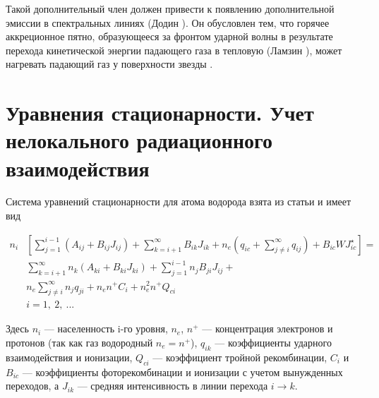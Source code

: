 \documentclass[12pt]{article}
\begin{document}
Такой дополнительный член должен привести к появлению дополнительной эмиссии в спектральных линиях (Додин \cite{dodin18}). Он обусловлен тем, что горячее аккреционное пятно, образующееся за фронтом ударной волны в результате перехода кинетической энергии падающего газа в тепловую (Ламзин \cite{lamzin98}),
 может нагревать падающий газ у поверхности звезды \cite{dodin18}.


\section{Уравнения стационарности. Учет нелокального радиационного взаимодействия}

Система уравнений стационарности для атома водорода взята из статьи \cite{katysheva80} и имеет вид

 
\begin{align} \label{eq:stat}
n_i & \left[ \sum\limits_{j=1}^{i-1} (A_{ij} + B_{ij}J_{ij}) + \sum\limits_{k=i+1}^\infty B_{ik}J_{ik} + n_e ( q_{ic} + \sum\limits_{j \neq i}^\infty q_{ij} ) + B_{ic}WJ_{ic}^\star \right] = \nonumber \\
 & \sum\limits_{k=i+1}^\infty n_k (A_{ki} + B_{ki}J_{ki}) + \sum\limits_{j=1}^{i-1} n_jB_{ji}J_{ij} + \nonumber \\
 & n_e \sum\limits_{j\neq i}^\infty n_jq_{ji} + n_en^+C_i + n_e^2n^+Q_{ci} \\
 & i=1,\ 2,\ ... \nonumber
\end{align}

Здесь $n_i$ --- населенность i-го уровня, $n_e$, $n^+$ --- концентрация электронов и протонов (так как газ водородный $n_e = n^+$), $q_{ik}$ --- коэффициенты ударного взаимодействия и ионизации, $Q_{ci}$ --- коэффициент тройной рекомбинации, $C_i$ и $B_{ic}$ --- коэффициенты фоторекомбинации и ионизации с учетом вынужденных переходов, а $J_{ik}$ --- средняя интенсивность в линии перехода $i\rightarrow k$.  
\end{document}
